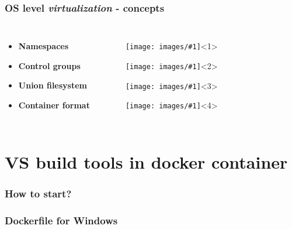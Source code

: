 \documentclass{beamer}
\newcommand{\slidegraphic}[2]{
    \texttt{[image: images/\#1]}<#2>%
}
\newcommand{\imagesblock}[1]{
    \vspace*{\fill}
    \begin{figure}
        \begin{overlayarea}{\columnwidth}{3cm}
            \begin{center}
            #1
            \end{center}
        \end{overlayarea}
    \end{figure}
    \vspace*{\fill}
}
\begin{document}
\begin{frame}
    \frametitle{OS level \textit{virtualization} - concepts}
    
    \begin{columns}[c, onlytextwidth]

            \setlength{\partopsep}{0pt}
            \begin{itemize}
                \item \textbf<1>{Namespaces}%
                \item \textbf<2>{Control groups}%
                \item \textbf<3>{Union filesystem}%
                \item \textbf<4>{Container format}%
            \end{itemize}
                
        \imagesblock{
            \slidegraphic{namespaces}{1}%
            \slidegraphic{control-groups}{2}%
            \slidegraphic{union-filesystem}{3}%
            \slidegraphic{placeholder}{4}%
        }

    \end{columns}
\end{frame}

\section[VS build tools in docker container]{VS build tools in docker container}

\begin{frame}
\frametitle{How to start?}
\end{frame}

\begin{frame}
\frametitle{Dockerfile for Windows}
\end{frame}
\end{document}
